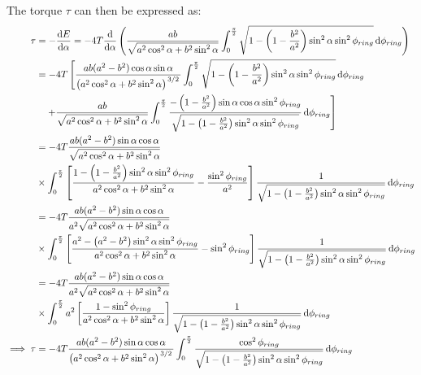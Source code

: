 The torque $\tau$ can then be expressed as:
\begingroup
\allowdisplaybreaks
\begin{align*}
    \tau &= -\dv{E}{\alpha} = -4T\dv{\alpha}\left(\frac{ab}{\sqrt{a^2\cos^2\alpha + b^2\sin^2\alpha}}\int_0^{\frac{\pi}{2}} \sqrt{1 - \left(1 - \frac{b^2}{a^2}\right)\sin^2\alpha\sin^2\phi_{ring}} \dd{\phi_{ring}}\right)\\
    &= -4T\left[\frac{ab(a^2 - b^2)\cos\alpha\sin\alpha}{\left(a^2\cos^2\alpha + b^2\sin^2\alpha\right)^{\flatfrac{3}{2}}}\int_0^{\frac{\pi}{2}} \sqrt{1 - \left(1 - \frac{b^2}{a^2}\right)\sin^2\alpha\sin^2\phi_{ring}} \dd{\phi_{ring}}\right.\\
    &\left.\quad + \frac{ab}{\sqrt{a^2\cos^2\alpha + b^2\sin^2\alpha}}\int_0^{\frac{\pi}{2}} \frac{-\left(1 - \frac{b^2}{a^2}\right)\sin\alpha\cos\alpha\sin^2\phi_{ring}}{\sqrt{1 - \left(1 - \frac{b^2}{a^2}\right)\sin^2\alpha\sin^2\phi_{ring}}} \dd{\phi_{ring}}\right]\\
    &= -4T\frac{ab(a^2 - b^2)\sin\alpha\cos\alpha}{\sqrt{a^2\cos^2\alpha + b^2\sin^2\alpha}}\\
    &\times\int_0^{\frac{\pi}{2}}\left[\frac{1 - \left(1 - \frac{b^2}{a^2}\right)\sin^2\alpha\sin^2\phi_{ring}}{a^2\cos^2\alpha + b^2\sin^2\alpha}-\frac{\sin^2\phi_{ring}}{a^2}\right]\frac{1}{\sqrt{1 - \left(1 - \frac{b^2}{a^2}\right)\sin^2\alpha\sin^2\phi_{ring}}}\dd{\phi_{ring}}\\
    &= -4T\frac{ab(a^2 - b^2)\sin\alpha\cos\alpha}{a^2\sqrt{a^2\cos^2\alpha + b^2\sin^2\alpha}}\\
    &\times\int_0^{\frac{\pi}{2}}\left[\frac{a^2 - \left(a^2 - b^2\right)\sin^2\alpha\sin^2\phi_{ring}}{a^2\cos^2\alpha + b^2\sin^2\alpha}-\sin^2\phi_{ring}\right]\frac{1}{\sqrt{1 - \left(1 - \frac{b^2}{a^2}\right)\sin^2\alpha\sin^2\phi_{ring}}}\dd{\phi_{ring}}\\
    &= -4T\frac{ab(a^2 - b^2)\sin\alpha\cos\alpha}{a^2\sqrt{a^2\cos^2\alpha + b^2\sin^2\alpha}}\\
    &\times\int_0^{\frac{\pi}{2}}a^2\left[\frac{1 - \sin^2\phi_{ring}}{a^2\cos^2\alpha + b^2\sin^2\alpha}\right]\frac{1}{\sqrt{1 - \left(1 - \frac{b^2}{a^2}\right)\sin^2\alpha\sin^2\phi_{ring}}}\dd{\phi_{ring}}\\
    \implies \tau &= -4T\frac{ab(a^2 - b^2)\sin\alpha\cos\alpha}{\left(a^2\cos^2\alpha + b^2\sin^2\alpha\right)^{\flatfrac{3}{2}}}\int_0^{\frac{\pi}{2}}\frac{\cos^2\phi_{ring}}{\sqrt{1 - \left(1 - \frac{b^2}{a^2}\right)\sin^2\alpha\sin^2\phi_{ring}}}\dd{\phi_{ring}}
\end{align*}
\endgroup

